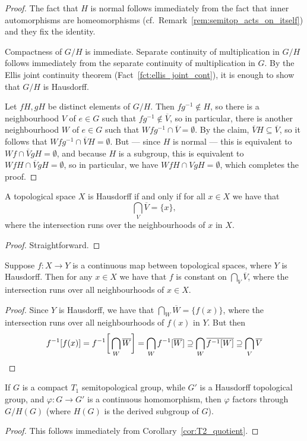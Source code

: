 \begin{proof}
		The fact that $H$ is normal follows immediately from the fact that inner automorphisms are homeomorphisms (cf.\ Remark~\ref{rem:semitop_acts_on_itself}) and they fix the identity.
		
		Compactness of $G/H$ is immediate. Separate continuity of multiplication in $G/H$ follows immediately from the separate continuity of multiplication in $G$. By the Ellis joint continuity theorem (Fact~\ref{fct:ellis_joint_cont}), it is enough to show that $G/H$ is Hausdorff.
		
		Let $fH,gH$ be distinct elements of $G/H$. Then $fg^{-1}\notin H$, so there is a neighbourhood $V$ of $e\in G$ such that $fg^{-1}\notin \overline V$, so in particular, there is another neighbourhood $W$ of $e\in G$ such that $Wfg^{-1}\cap \overline{V}=\emptyset$. By the claim, $\overline{V} H\subseteq \overline V$,
		so it follows that $Wfg^{-1}\cap \overline{V}H=\emptyset$. But --- since $H$ is normal --- this is equivalent to $Wf\cap \overline{V}gH=\emptyset$, and because $H$ is a subgroup, this is equivalent to $WfH\cap \overline{V}gH=\emptyset$, so in particular, we have $WfH\cap VgH=\emptyset$, which completes the proof.
	\end{proof}
	
	
	\begin{fct}
		A topological space $X$ is Hausdorff if and only if for all $x\in X$ we have that
		\[
		\bigcap_{V}\overline V=\{x\},
		\]
		where the intersection runs over the neighbourhoods of $x$ in $X$.
	\end{fct}
	\begin{proof}
		Straightforward.
	\end{proof}
	
	\begin{cor}
		\label{cor:T2_quotient}
		Suppose $f\colon X\to Y$ is a continuous map between topological spaces, where $Y$ is Hausdorff. Then for any $x\in X$ we have that $f$ is constant on $\bigcap_V{\overline V}$, where the intersection runs over all neighbourhoods of $x\in X$.
	\end{cor}
	\begin{proof}
		Since $Y$ is Hausdorff, we have that $\bigcap_W \overline W=\{f(x)\}$, where the intersection runs over all neighbourhoods of $f(x)$ in $Y$. But then
		\[
		f^{-1}[f(x)]=f^{-1}\bigg[\bigcap_W \overline W\bigg]=\bigcap_W f^{-1}[\overline W]\supseteq\bigcap_W \overline {f^{-1}[W]}\supseteq \bigcap_V{\overline V}\qedhere
		\]
	\end{proof}
	
	\begin{cor}
		\label{cor:H(G)_universal}
		If $G$ is a compact $T_1$ semitopological group, while $G'$ is a Hausdorff topological group, and $\varphi\colon G\to G'$ is a continuous homomorphism, then $\varphi$ factors through $G/H(G)$ (where $H(G)$ is the derived subgroup of $G$).
	\end{cor}
	\begin{proof}
		This follows immediately from Corollary~\ref{cor:T2_quotient}.
	\end{proof}
	
